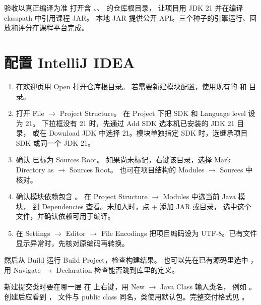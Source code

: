 \documentclass[UTF8,11pt,a4paper]{ctexart}
\begin{document}
\maketitle
\thispagestyle{fancy}

\begin{keybox}{验收以真正编译为准}
打开含 、、 的仓库根目录，
让项目用 JDK 21 并在编译 classpath 中引用课程 JAR。
本地 JAR 提供公开 API。三个种子的引擎运行、回放和评分在课程平台完成。
\end{keybox}

\section{配置 IntelliJ IDEA}

\begin{enumerate}
  \item 在欢迎页用 \textsf{Open} 打开仓库根目录。
  若需要新建模块配置，使用现有的  和  目录。
  \item 打开 \textsf{File} $\to$ \textsf{Project Structure}。
  在 \textsf{Project} 下把 \textsf{SDK} 和 \textsf{Language level} 设为 21。
  下拉框没有 21 时，先通过 \textsf{Add SDK} 选本机已安装的 JDK 21 目录，
  或在 \textsf{Download JDK} 中选择 21。模块单独指定 SDK 时，选继承项目 SDK 或同一个 JDK 21。
  \item 确认  已标为 \textsf{Sources Root}。
  如果尚未标记，右键该目录，选择 \textsf{Mark Directory as} $\to$ \textsf{Sources Root}。
  也可在项目结构的 \textsf{Modules} $\to$ \textsf{Sources} 中核对。
  \item 确认模块依赖包含 。
  在 \textsf{Project Structure} $\to$ \textsf{Modules} 中选当前 Java 模块，
  到 \textsf{Dependencies} 查看。未加入时，点 \textsf{+} 添加 JAR 或目录，
  选中这个文件，并确认依赖可用于编译。
  \item 在 \textsf{Settings} $\to$ \textsf{Editor} $\to$ \textsf{File Encodings}
  把项目编码设为 UTF-8。已有文件显示异常时，先核对原编码再转换。
\end{enumerate}

然后从 \textsf{Build} 运行 \textsf{Build Project}，检查构建结果。
也可以先在已有源码里选中 ，用 \textsf{Navigate} $\to$ \textsf{Declaration}
检查能否跳到库里的定义。

\begin{keybox}{新建提交类时要在哪一层}
在  上右键，用 \textsf{New} $\to$ \textsf{Java Class} 输入类名，
例如 。创建后应看到 ，
文件与 public class 同名，类使用默认包。完整交付格式见
。
\end{keybox}
\end{document}
